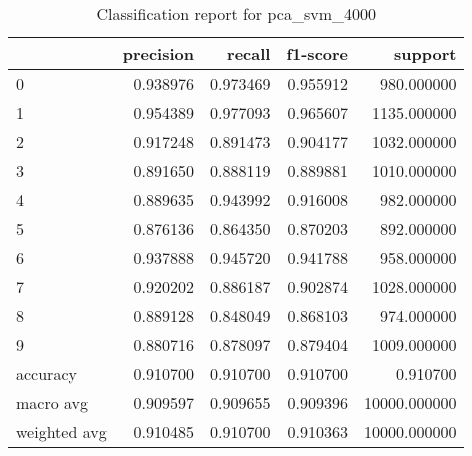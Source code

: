 \begin{table}[htb!]
\centering
\caption{Classification report for pca_svm_4000}
\label{tab:classification-report-pca_svm_4000}
\begin{tabular}{lrrrr}
\toprule
 & precision & recall & f1-score & support \\
\midrule
0 & 0.938976 & 0.973469 & 0.955912 & 980.000000 \\
1 & 0.954389 & 0.977093 & 0.965607 & 1135.000000 \\
2 & 0.917248 & 0.891473 & 0.904177 & 1032.000000 \\
3 & 0.891650 & 0.888119 & 0.889881 & 1010.000000 \\
4 & 0.889635 & 0.943992 & 0.916008 & 982.000000 \\
5 & 0.876136 & 0.864350 & 0.870203 & 892.000000 \\
6 & 0.937888 & 0.945720 & 0.941788 & 958.000000 \\
7 & 0.920202 & 0.886187 & 0.902874 & 1028.000000 \\
8 & 0.889128 & 0.848049 & 0.868103 & 974.000000 \\
9 & 0.880716 & 0.878097 & 0.879404 & 1009.000000 \\
accuracy & 0.910700 & 0.910700 & 0.910700 & 0.910700 \\
macro avg & 0.909597 & 0.909655 & 0.909396 & 10000.000000 \\
weighted avg & 0.910485 & 0.910700 & 0.910363 & 10000.000000 \\
\bottomrule
\end{tabular}
\end{table}
